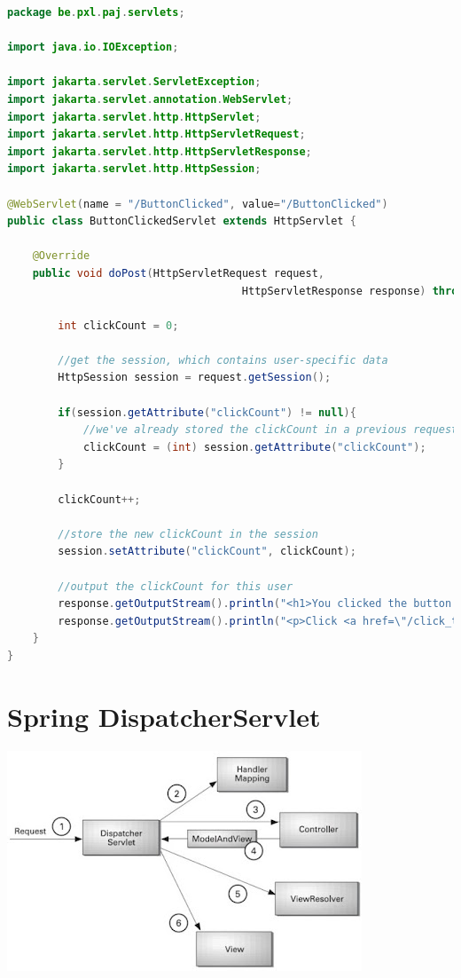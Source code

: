 \begin{lstlisting}[language=java, frame=single]
package be.pxl.paj.servlets;

import java.io.IOException;

import jakarta.servlet.ServletException;
import jakarta.servlet.annotation.WebServlet;
import jakarta.servlet.http.HttpServlet;
import jakarta.servlet.http.HttpServletRequest;
import jakarta.servlet.http.HttpServletResponse;
import jakarta.servlet.http.HttpSession;

@WebServlet(name = "/ButtonClicked", value="/ButtonClicked")
public class ButtonClickedServlet extends HttpServlet {

	@Override
	public void doPost(HttpServletRequest request, 
	                                 HttpServletResponse response) throws IOException, ServletException {

		int clickCount = 0;

		//get the session, which contains user-specific data
		HttpSession session = request.getSession();

		if(session.getAttribute("clickCount") != null){
			//we've already stored the clickCount in a previous request, so get it
			clickCount = (int) session.getAttribute("clickCount");
		}

		clickCount++;

		//store the new clickCount in the session
		session.setAttribute("clickCount", clickCount);

		//output the clickCount for this user
		response.getOutputStream().println("<h1>You clicked the button " + clickCount + " times.</h1>");
		response.getOutputStream().println("<p>Click <a href=\"/click_the_button.html\">here</a> to go back to the button.</p>");
	}
}
\end{lstlisting}


\section{Spring DispatcherServlet}


\includegraphics{./images/chapter8/spring_mvc}

